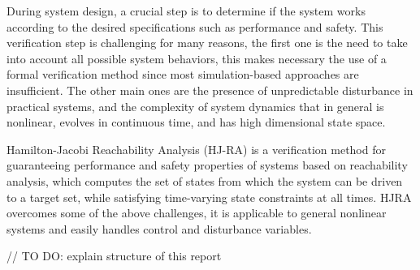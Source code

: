 During system design, a crucial step is to determine if the system works according to the desired specifications such as performance and safety. This verification step is challenging for many reasons, the first one is the need to take into account all possible system behaviors, this makes necessary the use of a formal verification method since most simulation-based approaches are insufficient. The other main ones are the presence of unpredictable disturbance in practical systems, and the complexity of system dynamics that in general is nonlinear, evolves in continuous time, and has high dimensional state space.

Hamilton-Jacobi Reachability Analysis (HJ-RA) is a verification method for guaranteeing performance and safety properties of systems based on reachability analysis, which computes the set of states from which the system can be driven to a target set, while satisfying time-varying state constraints at all times. HJRA overcomes some of the above challenges, it is applicable to general nonlinear systems and easily handles control and disturbance variables. 

// TO DO: explain structure of this report